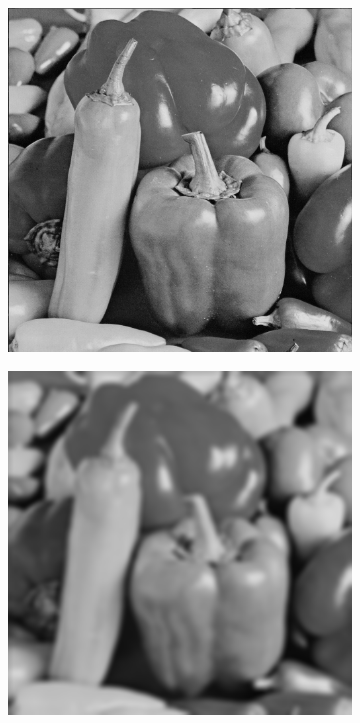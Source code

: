 \begin{figure}[htbp]
\begin{subfigure}[b]{0.2\textwidth}
    \vspace*{0.02\textwidth}
  \end{subfigure}%
  \hspace*{0.02\textwidth}
  \begin{subfigure}[b]{0.2\textwidth}
    \centering
    \includegraphics[width=\textwidth]{figs/fourier/peppers_original.png}
    \vspace*{0.02\textwidth}
  \end{subfigure}%
  \hspace*{0.02\textwidth}
  \begin{subfigure}[b]{0.2\textwidth}
    \centering
    \includegraphics[width=\textwidth]{figs/fourier/peppers_blur_original.png}
    \vspace*{0.02\textwidth}
  \end{subfigure}


\end{figure}
